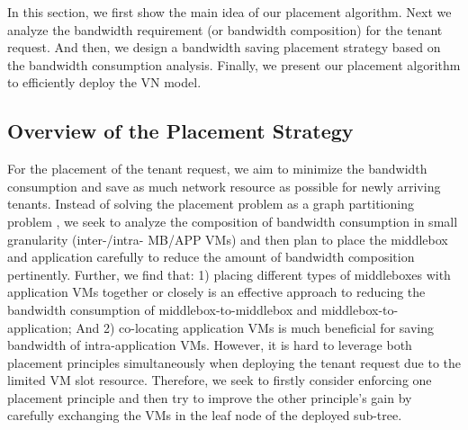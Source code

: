 \documentclass[review]{elsarticle}
\begin{document}
In this section, we first show the main idea of our placement algorithm. Next we analyze the bandwidth requirement (or bandwidth composition) for the tenant request. And then, we design a bandwidth saving placement strategy based on the bandwidth consumption analysis. Finally, we present our placement algorithm to efficiently deploy the VN model. 


\subsection{Overview of the Placement Strategy}%
For the placement of the tenant request, we aim to minimize the bandwidth consumption and save as much network resource as possible for newly arriving tenants. Instead of solving the placement problem as a graph partitioning problem \cite{stratos12}, we seek to analyze the composition of bandwidth consumption in small granularity (inter-/intra- MB/APP VMs) and then plan to place the middlebox and application carefully to reduce the amount of bandwidth composition pertinently.
Further, we find that: 1) placing different types of middleboxes with application VMs together or closely is an effective approach to reducing the bandwidth consumption of middlebox-to-middlebox and middlebox-to-application; And 2) co-locating application VMs is much beneficial for saving bandwidth of intra-application VMs. However, it is hard to leverage both placement principles simultaneously 
when deploying the tenant request due to the limited VM slot resource. %
Therefore, we seek to firstly consider enforcing one placement principle and then try to improve the other principle's gain by carefully exchanging the
VMs in the leaf node of the deployed sub-tree.
\end{document}
